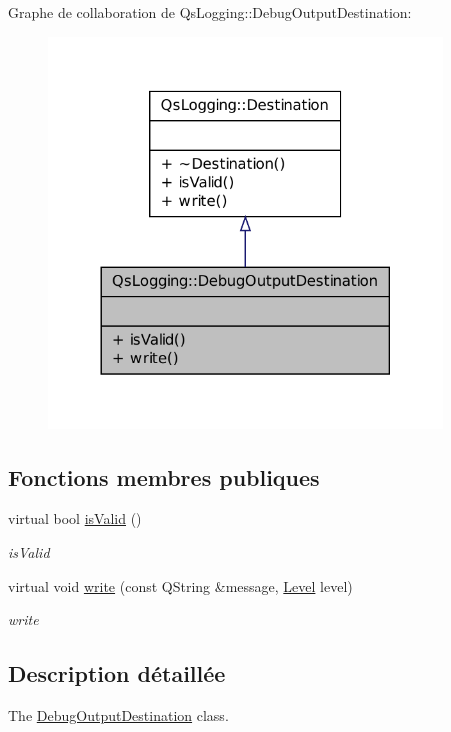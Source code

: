 Graphe de collaboration de Qs\-Logging\-:\-:Debug\-Output\-Destination\-:
\nopagebreak
\begin{figure}[H]
\begin{center}
\leavevmode
\includegraphics[width=296pt]{classQsLogging_1_1DebugOutputDestination__coll__graph}
\end{center}
\end{figure}
\subsection*{Fonctions membres publiques}
\begin{DoxyCompactItemize}
\item 
virtual bool \hyperlink{classQsLogging_1_1DebugOutputDestination_a7e260f310b5f757ecab216058d0808a9}{is\-Valid} ()
\begin{DoxyCompactList}\small\item\em is\-Valid \end{DoxyCompactList}\item 
virtual void \hyperlink{classQsLogging_1_1DebugOutputDestination_a72c60cc3a3f6cb9d63dd88528b7e1125}{write} (const Q\-String \&message, \hyperlink{namespaceQsLogging_a38c7dd87e4de6f8eb460763ad0baa033}{Level} level)
\begin{DoxyCompactList}\small\item\em write \end{DoxyCompactList}\end{DoxyCompactItemize}


\subsection{Description détaillée}
The \hyperlink{classQsLogging_1_1DebugOutputDestination}{Debug\-Output\-Destination} class. 

